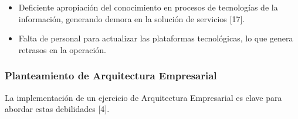 \documentclass[
	a4paper, %
	12pt, %
]{include/CSSullivanBusinessReport}
\def\tightlist{}
\begin{document}
\begin{itemize}
  \begin{itemize}
  \tightlist
  \item
    Deficiente apropiación del conocimiento en procesos de tecnologías
    de la información, generando demora en la solución de servicios
    {[}17{]}.
  \item
    Falta de personal para actualizar las plataformas tecnológicas, lo
    que genera retrasos en la operación.
  \end{itemize}
\end{itemize}

\subsubsection{Planteamiento de Arquitectura
Empresarial}\label{sec:planteamiento-de-arquitectura-empresarial}

La implementación de un ejercicio de Arquitectura Empresarial es clave
para abordar estas debilidades {[}4{]}.
\end{document}
